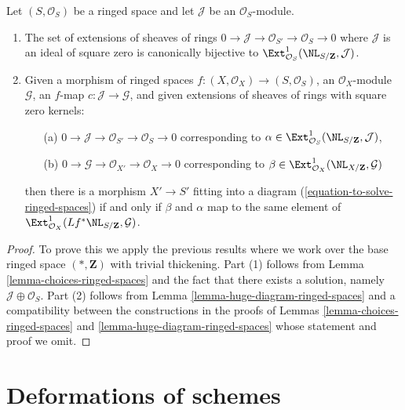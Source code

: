 \begin{lemma}
\label{lemma-extensions-of-ringed-spaces}
Let $(S, \mathcal{O}_S)$ be a ringed space and let $\mathcal{J}$
be an $\mathcal{O}_S$-module.
\begin{enumerate}
\item The set of extensions of sheaves of rings
$0 \to \mathcal{J} \to \mathcal{O}_{S'} \to \mathcal{O}_S \to 0$
where $\mathcal{J}$ is an ideal of square zero is canonically bijective to
$\Ext^1_{\mathcal{O}_S}(\NL_{S/\mathbf{Z}}, \mathcal{J})$.
\item Given a morphism of ringed spaces
$f : (X, \mathcal{O}_X) \to (S, \mathcal{O}_S)$, an $\mathcal{O}_X$-module
$\mathcal{G}$, an $f$-map $c : \mathcal{J} \to \mathcal{G}$, and
given extensions of sheaves of rings with square zero kernels:
\begin{enumerate}
\item[(a)] $0 \to \mathcal{J} \to \mathcal{O}_{S'} \to \mathcal{O}_S \to 0$
corresponding to
$\alpha \in \Ext^1_{\mathcal{O}_S}(\NL_{S/\mathbf{Z}}, \mathcal{J})$,
\item[(b)] $0 \to \mathcal{G} \to \mathcal{O}_{X'} \to \mathcal{O}_X \to 0$
corresponding to
$\beta \in \Ext^1_{\mathcal{O}_X}(\NL_{X/\mathbf{Z}}, \mathcal{G})$
\end{enumerate}
then there is a morphism $X' \to S'$ fitting into a diagram
(\ref{equation-to-solve-ringed-spaces}) if and only if $\beta$ and $\alpha$
map to the same element of
$\Ext^1_{\mathcal{O}_X}(Lf^*\NL_{S/\mathbf{Z}}, \mathcal{G})$.
\end{enumerate}
\end{lemma}

\begin{proof}
To prove this we apply the previous results where we work over
the base ringed space $(*, \mathbf{Z})$ with trivial thickening.
Part (1) follows from Lemma \ref{lemma-choices-ringed-spaces}
and the fact that there exists a solution, namely
$\mathcal{J} \oplus \mathcal{O}_S$.
Part (2) follows from Lemma \ref{lemma-huge-diagram-ringed-spaces}
and a compatibility between the constructions in the proofs
of Lemmas \ref{lemma-choices-ringed-spaces} and
\ref{lemma-huge-diagram-ringed-spaces}
whose statement and proof we omit.
\end{proof}








\section{Deformations of schemes}
\label{section-deformations-schemes}

